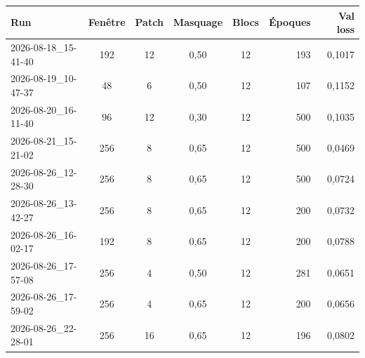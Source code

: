 \begin{tabular}{lccccrr}
\toprule
Run & Fenêtre & Patch & Masquage & Blocs & Époques & Val loss \\
\midrule
2026-08-18\_15-41-40 & 192 & 12 & 0,50 & 12 & 193 & 0,1017 \\
2026-08-19\_10-47-37 & 48 & 6 & 0,50 & 12 & 107 & 0,1152 \\
2026-08-20\_16-11-40 & 96 & 12 & 0,30 & 12 & 500 & 0,1035 \\
2026-08-21\_15-21-02 & 256 & 8 & 0,65 & 12 & 500 & 0,0469 \\
2026-08-26\_12-28-30 & 256 & 8 & 0,65 & 12 & 500 & 0,0724 \\
2026-08-26\_13-42-27 & 256 & 8 & 0,65 & 12 & 200 & 0,0732 \\
2026-08-26\_16-02-17 & 192 & 8 & 0,65 & 12 & 200 & 0,0788 \\
2026-08-26\_17-57-08 & 256 & 4 & 0,50 & 12 & 281 & 0,0651 \\
2026-08-26\_17-59-02 & 256 & 4 & 0,65 & 12 & 200 & 0,0656 \\
2026-08-26\_22-28-01 & 256 & 16 & 0,65 & 12 & 196 & 0,0802 \\
\bottomrule
\end{tabular}
